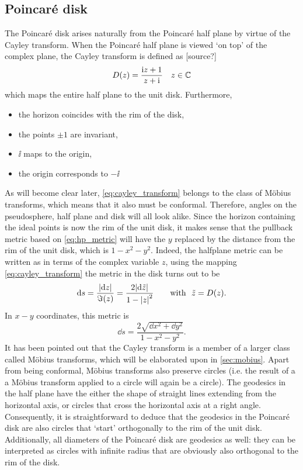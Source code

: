 \subsection{Poincaré disk}
The Poincaré disk arises naturally from the Poincaré half plane by virtue of the Cayley transform. When the Poincaré half plane is viewed `on top' of the complex plane, the Cayley transform is defined as [source?]
\begin{equation}
    D(z) = \frac{\mathrm{i} z + 1}{z + \mathrm{i}}\quad z \in \mathbb{C}
    \label{eq:cayley_transform}
\end{equation}
which maps the entire half plane to the unit disk. Furthermore, 
\begin{itemize}
    \item the horizon coincides with the rim of the disk,
    \item the points \(\pm1\) are invariant,
    \item \(\ii\) maps to the origin, 
    \item the origin corresponds to \(-\ii\)
\end{itemize}
As will become clear later, \cref{eq:cayley_transform} belongs to the class of Möbius transforms, which means that it also must be conformal. Therefore, angles on the pseudosphere, half plane and disk will all look alike. Since the horizon containing the ideal points is now the rim of the unit disk, it makes sense that the pullback metric based on \cref{eq:hp_metric} will have the $y$ replaced by the distance from the rim of the unit disk, which is $1 - x^2 - y^2$. Indeed, the halfplane metric can be written as in terms of the complex variable $z$, using the mapping \cref{eq:cayley_transform} the metric in the disk turns out to be \cite{Needham1997}
\[
    \dd{s} = \frac{\abs{\dd{z}}}{\imaginary(z)} = \frac{2\abs{\dd{\tilde{z}}}}{1 - \abs{z}^2} \qquad \text{with }\ \tilde{z} = D(z).
\]
In \(x-y\) coordinates, this metric is
\begin{equation}
    \dd{s} = \frac{2\sqrt{\dd{x}^2 + \dd{y}^2}}{1 - x^2 - y^2}.
\end{equation}
It has been pointed out that the Cayley transform is a member of a larger class called Möbius transforms, which will be elaborated upon in \cref{sec:mobius}. Apart from being conformal, Möbius transforms also preserve circles (i.e. the result of a a Möbius transform applied to a circle will again be a circle). The geodesics in the half plane have the either the shape of straight lines extending from the horizontal axis, or circles that cross the horizontal axis at a right angle. Consequently, it is straightforward to deduce that the geodesics in the Poincaré disk are also circles that `start' orthogonally to the rim of the unit disk. Additionally, all diameters of the Poincaré disk are geodesics as well: they can be interpreted as circles with infinite radius that are obviously also orthogonal to the rim of the disk.


